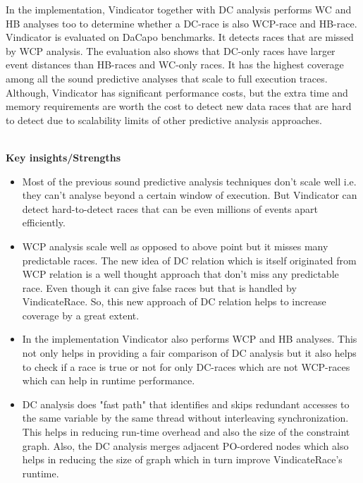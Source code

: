 \documentclass[20pt]{letter}
\begin{document}
\begin{enumerate}
{In the implementation, Vindicator together with DC analysis performs WC and HB analyses too to determine whether a DC-race is also WCP-race and HB-race. Vindicator is evaluated on DaCapo benchmarks. It detects races that are missed by WCP analysis. The evaluation also shows that DC-only races have larger event distances than HB-races and WC-only races. It has the highest coverage among all the sound predictive analyses that scale to full execution traces. Although, Vindicator has significant performance costs, but the extra time and memory requirements are worth the cost to detect new data races that are hard to detect due to scalability limits of other predictive analysis approaches.

\pagebreak

\textbf{\\Key insights/Strengths}\\
\begin{itemize}
    \item Most of the previous sound predictive analysis techniques don't scale well i.e. they can't analyse beyond a certain window of execution. But Vindicator can detect hard-to-detect races that can be even millions of events apart efficiently.
    \item WCP analysis scale well as opposed to above point but it misses many predictable races. The new idea of DC relation which is itself originated from WCP relation is a well thought approach that don't miss any predictable race. Even though it can give false races but that is handled by VindicateRace. So, this new approach of DC relation helps to increase coverage by a great extent.
    \item In the implementation Vindicator also performs WCP and HB analyses. This not only helps in providing a fair comparison of DC analysis but it also helps to check if a race is true or not for only DC-races which are not WCP-races which can help in runtime performance.
    \item DC analysis does "fast path" that identifies and skips redundant accesses to the same variable by the same thread without interleaving synchronization. This helps in reducing run-time overhead and also the size of the constraint graph. Also, the DC analysis merges adjacent PO-ordered nodes which also helps in reducing the size of graph which in turn improve VindicateRace's runtime. 
\end{itemize}

}
\end{enumerate}
\end{document}
